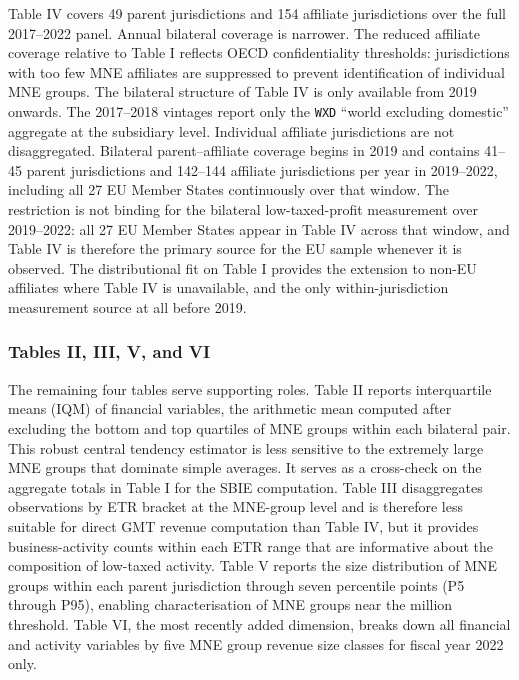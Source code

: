\documentclass[11pt,a4paper]{article}
\newcommand{\EUR}{\texteuro}
\newcommand{\code}[1]{\texttt{#1}}
\begin{document}
Table IV covers 49 parent jurisdictions and 154 affiliate jurisdictions over the full 2017--2022 panel. Annual bilateral coverage is narrower. The reduced affiliate coverage relative to Table I reflects OECD confidentiality thresholds: jurisdictions with too few MNE affiliates are suppressed to prevent identification of individual MNE groups. The bilateral structure of Table IV is only available from 2019 onwards. The 2017--2018 vintages report only the \code{WXD} ``world excluding domestic'' aggregate at the subsidiary level. Individual affiliate jurisdictions are not disaggregated. Bilateral parent--affiliate coverage begins in 2019 and contains 41--45 parent jurisdictions and 142--144 affiliate jurisdictions per year in 2019--2022, including all 27 EU Member States continuously over that window. The restriction is not binding for the bilateral low-taxed-profit measurement over 2019--2022: all 27 EU Member States appear in Table IV across that window, and Table IV is therefore the primary source for the EU sample whenever it is observed. The distributional fit on Table I provides the extension to non-EU affiliates where Table IV is unavailable, and the only within-jurisdiction measurement source at all before 2019.

\subsubsection{Tables II, III, V, and VI}\label{sec:other_tables}

The remaining four tables serve supporting roles. Table II reports interquartile means (IQM) of financial variables, the arithmetic mean computed after excluding the bottom and top quartiles of MNE groups within each bilateral pair. This robust central tendency estimator is less sensitive to the extremely large MNE groups that dominate simple averages. It serves as a cross-check on the aggregate totals in Table I for the SBIE computation. Table III disaggregates observations by ETR bracket at the MNE-group level and is therefore less suitable for direct GMT revenue computation than Table IV, but it provides business-activity counts within each ETR range that are informative about the composition of low-taxed activity. Table V reports the size distribution of MNE groups within each parent jurisdiction through seven percentile points (P5 through P95), enabling characterisation of MNE groups near the \EUR750 million threshold. Table VI, the most recently added dimension, breaks down all financial and activity variables by five MNE group revenue size classes for fiscal year 2022 only.
\end{document}
